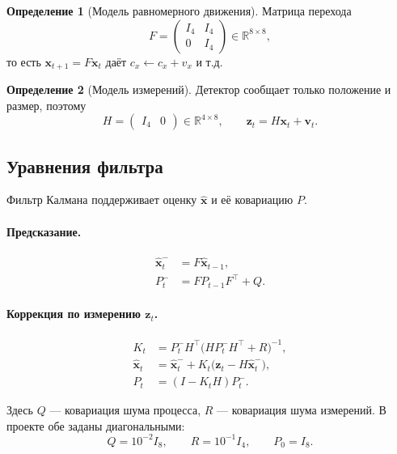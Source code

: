 \documentclass[11pt,a4paper]{article}
\theoremstyle{definition}
\newtheorem{definition}{Определение}[section]
\theoremstyle{remark}
\begin{document}
\begin{definition}[Модель равномерного движения]
Матрица перехода
\[
  F = \begin{pmatrix}
    I_4 & I_4 \\
    0   & I_4
  \end{pmatrix} \in \mathbb{R}^{8\times 8},
\]
то есть $\mathbf{x}_{t+1} = F\mathbf{x}_t$ даёт
$c_x \leftarrow c_x + v_x$ и т.д.
\end{definition}

\begin{definition}[Модель измерений]
Детектор сообщает только положение и размер, поэтому
\[
  H = \begin{pmatrix} I_4 & 0 \end{pmatrix} \in \mathbb{R}^{4\times 8},
  \qquad \mathbf{z}_t = H\mathbf{x}_t + \mathbf{v}_t .
\]
\end{definition}

\subsection{Уравнения фильтра}

Фильтр Калмана поддерживает оценку $\hat{\mathbf{x}}$ и её ковариацию $P$.

\paragraph{Предсказание.}
\begin{align}
  \hat{\mathbf{x}}^-_t &= F \hat{\mathbf{x}}_{t-1}, \\
  P^-_t &= F P_{t-1} F^\top + Q .
\end{align}

\paragraph{Коррекция по измерению $\mathbf{z}_t$.}
\begin{align}
  K_t &= P^-_t H^\top \bigl(H P^-_t H^\top + R\bigr)^{-1}, \\
  \hat{\mathbf{x}}_t &= \hat{\mathbf{x}}^-_t + K_t\bigl(\mathbf{z}_t - H\hat{\mathbf{x}}^-_t\bigr), \\
  P_t &= (I - K_t H) P^-_t .
\end{align}

Здесь $Q$ --- ковариация шума процесса, $R$ --- ковариация шума измерений.
В проекте обе заданы диагональными:
\[
  Q = 10^{-2} I_8, \qquad R = 10^{-1} I_4, \qquad P_0 = I_8 .
\]
\end{document}
